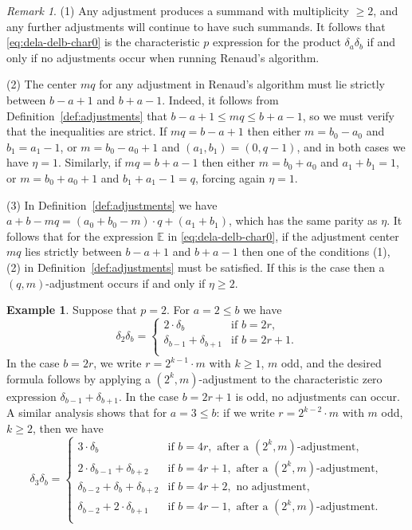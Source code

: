\documentclass[11pt,reqno]{amsart}
\newcommand{\bb}[1]{\mathbb{#1}}
\theoremstyle{definition}
\newtheorem{example}[theorem]{Example}
\theoremstyle{remark}
\newtheorem{remark}[theorem]{Remark}
\numberwithin{equation}{section}
\begin{document}
\begin{remark}\label{rem:Renaud}
(1) Any adjustment produces a summand with multiplicity $\geq 2$, and any further adjustments will continue to have such summands. It follows that \eqref{eq:dela-delb-char0} is the characteristic $p$ expression for the product $\delta_a\delta_b$ if and only if no adjustments occur when running Renaud's algorithm.

\noindent (2) The center $mq$ for any adjustment in Renaud's algorithm must lie strictly between $b-a+1$ and $b+a-1$. Indeed, it follows from Definition~\ref{def:adjustments} that $b-a+1\leq mq\leq b+a-1$, so we must verify that the inequalities are strict. If $mq=b-a+1$ then either $m=b_0-a_0$ and $b_1=a_1-1$, or $m=b_0-a_0+1$ and $(a_1,b_1)=(0,q-1)$, and in both cases we have $\eta=1$. Similarly, if $mq=b+a-1$ then either $m=b_0+a_0$ and $a_1+b_1=1$, or $m=b_0+a_0+1$ and $b_1+a_1-1=q$, forcing again $\eta=1$.

\noindent (3) In Definition~\ref{def:adjustments} we have $a+b-mq = (a_0+b_0-m)\cdot q+(a_1+b_1)$, which has the same parity as $\eta$. It follows that for the expression $\bb{E}$ in \eqref{eq:dela-delb-char0}, if the adjustment center $mq$ lies strictly between $b-a+1$ and $b+a-1$ then one of the conditions (1), (2) in Definition~\ref{def:adjustments} must be satisfied. If this is the case then a $(q,m)$-adjustment occurs if and only if $\eta\geq 2$.
\end{remark}


\begin{example}\label{ex:smalla-p=2}
    Suppose that $p=2$. For $a=2\leq b$ we have
    \[ \delta_2\delta_b = \begin{cases}
        2\cdot\delta_{b} & \text{if }b=2r,\\
        \delta_{b-1} + \delta_{b+1} & \text{if }b=2r+1.\\
    \end{cases}\]
    In the case $b=2r$, we write $r=2^{k-1}\cdot m$ with $k\geq 1$, $m$ odd, and the desired formula follows by applying a $(2^k,m)$-adjustment to the characteristic zero expression $\delta_{b-1}+\delta_{b+1}$. In the case $b=2r+1$ is odd, no adjustments can occur. A similar analysis shows that for $a=3\leq b$: if we write $r=2^{k-2}\cdot m$ with $m$ odd, $k\geq 2$, then we have
    \[
    \delta_3\delta_b = 
    \begin{cases}
        3\cdot \delta_{b} & \text{if }b=4r,\text{ after a $(2^k,m)$-adjustment},\\
        2\cdot \delta_{b-1}+\delta_{b+2} & \text{if }b=4r+1,\text{ after a $(2^k,m)$-adjustment},\\
        \delta_{b-2}+\delta_b+\delta_{b+2} & \text{if }b=4r+2,\text{ no adjustment},\\
        \delta_{b-2}+2\cdot \delta_{b+1} & \text{if }b=4r-1,\text{ after a $(2^k,m)$-adjustment}.\\
    \end{cases}
    \]
\end{example}
\end{document}
